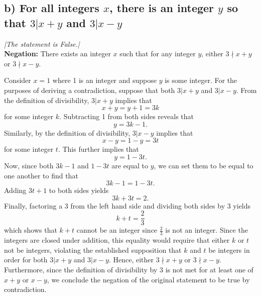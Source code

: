 \documentclass[11pt, letterpaper]{article}
\begin{document}
\subsection*{b) For all integers $x$, there is an integer $y$ so that $3|x+y$ and $3|x-y$}
{\large\it |The statement is False.|}\\[0.25cm]
{\bf Negation:} There exists an integer $x$ such that for any integer $y$, either $3\nmid x+y$ or $3\nmid x-y$.
\begin{prf}[by contradiction]
    Consider $x=1$ where 1 is an integer and suppose $y$ is some integer. For the purposes of deriving a contradiction, suppose that both 
    $3|x+y$ and $3|x-y$. From the definition of divisibility, $3|x+y$ implies that
    \[x+y=y+1=3k\]
    for some integer $k$. Subtracting 1 from both sides reveals that
    \[y=3k-1\text{.}\]
    Similarly, by the definition of divisibility, $3|x-y$ implies that
    \[x-y=1-y=3t\]
    for some integer $t$. This further implies that
    \[y=1-3t\text{.}\]
    Now, since both $3k-1$ and $1-3t$ are equal to $y$, we can set them to be equal to 
    one another to find that
    \[3k-1=1-3t\text{.}\]
    Adding $3t+1$ to both sides yields
    \[3k+3t=2\text{.}\]
    Finally, factoring a 3 from the left hand side and dividing both sides by 3 yields
    \[k+t=\frac{2}{3}\]
    which shows that $k+t$ cannot be an integer since $\frac{2}{3}$ is not an integer.
    Since the integers are closed under addition, this equality would require that either $k$ or $t$ not be integers, violating the established
    supposition that $k$ and $t$ be integers in order for both $3|x+y$ and $3|x-y$. Hence, either 
    $3\nmid x+y$ or $3\nmid x-y$. Furthermore, since the definition of divisibility by 3 is not met for at least one of $x+y$ or 
    $x-y$, we conclude the negation of the original statement to be true by contradiction. 
\end{prf}
\end{document}
